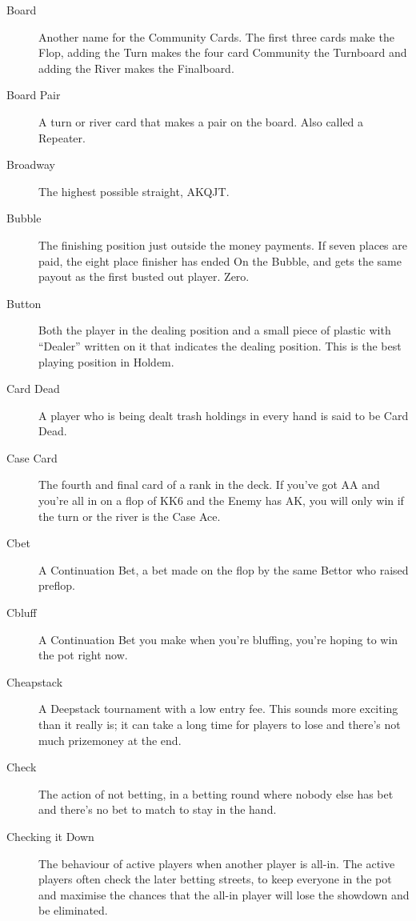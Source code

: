 \begin{description}
\item[Board] Another name for the Community Cards. The first three
cards make the Flop, adding the Turn makes the four card Community the
Turnboard and adding the River makes the Finalboard.

\item[Board Pair] A turn or river card that makes a pair on the
board. Also called a Repeater.

\item[Broadway] The highest possible straight, AKQJT.

\item[Bubble] The finishing position just outside the money payments.
If seven places are paid, the eight place finisher has ended On the
Bubble, and gets the same payout as the first busted out player. Zero.

\item[Button] Both the player in the dealing position and a small
piece of plastic with ``Dealer'' written on it that indicates the
dealing position. This is the best playing position in Holdem.

\item[Card Dead] A player who is being dealt trash holdings in every
hand is said to be Card Dead.

\item[Case Card] The fourth and final card of a rank in the deck. If
you've got AA and you're all in on a flop of KK6 and the Enemy has AK,
you will only win if the turn or the river is the Case Ace.

\item[Cbet] A Continuation Bet, a bet made on the flop by the same Bettor
who raised preflop.

\item[Cbluff] A Continuation Bet you make when you're bluffing, you're
hoping to win the pot right now.

\item[Cheapstack] A Deepstack tournament with a low entry fee. This
sounds more exciting than it really is; it can take a long time for
players to lose and there's not much prizemoney at the end.

\item[Check] The action of not betting, in a betting round where
nobody else has bet and there's no bet to match to stay in the hand.

\item[Checking it Down] The behaviour of active players when another
player is all-in. The active players often check the later betting
streets, to keep everyone in the pot and maximise the chances that the
all-in player will lose the showdown and be eliminated.


\end{description}
